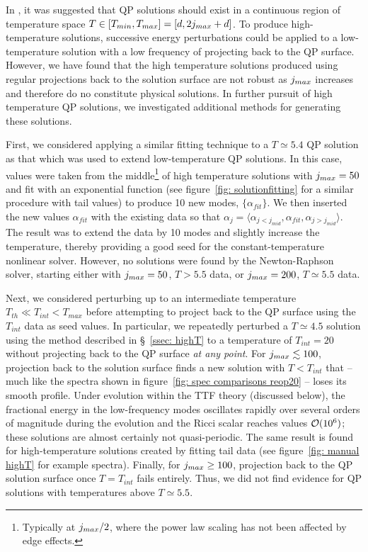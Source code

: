 \documentclass[../PhD.tex]{subfiles}
\begin{document}
In \cite{1507.08261}, it was suggested that QP solutions should exist in a continuous region of temperature space ${T \in [T_{min}, T_{max}] = [d, 2j_{max} + d]}$. To produce high-temperature solutions, successive energy perturbations could be applied to a low-temperature solution with a low frequency of projecting back to the QP surface. However, we have found that the high temperature solutions produced using regular projections back to the solution surface are not robust as $j_{max}$ increases and therefore do no constitute physical solutions. In further pursuit of high temperature QP solutions, we investigated additional methods for generating these solutions.

First, we considered applying a similar fitting technique to a $T \simeq 5.4$ QP solution as that which was used to extend low-temperature QP solutions. In this case, values were taken from the middle\footnote{Typically at $j_{max} / 2$, where the power law scaling has not been affected by edge effects.} of high temperature solutions with $j_{max} = 50$ and fit with an exponential function (see figure~\ref{fig: solutionfitting} for a similar procedure with tail values) to produce 10 new modes, $\{ \alpha_{fit} \}$. We then inserted the new values $\alpha_{fit}$ with the existing data so that $\alpha_j = \langle \alpha_{j< j_{mid}}, \alpha_{fit}, \alpha_{j > j_{mid}} \rangle$. The result was to extend the data by 10 modes and slightly increase the temperature, thereby providing a good seed for the constant-temperature nonlinear solver. However, no solutions were found by the Newton-Raphson solver, starting either with $j_{max} = 50$, $T>5.5$ data, or $j_{max} = 200$, $T \simeq 5.5$ data.

Next, we considered perturbing up to an intermediate temperature $T_{th} \ll T_{int} < T_{max}$ before attempting to project back to the QP surface using the $T_{int}$ data as seed values. In particular, we repeatedly perturbed a $T \simeq 4.5$ solution using the method described in \S~\ref{ssec: highT} to a temperature of $T_{int} = 20$ without projecting back to the QP surface \emph{at any point}. For $j_{max} \lesssim 100$, projection back to the solution surface finds a new solution with $T < T_{int}$ that -- much like the spectra shown in figure~\ref{fig: spec comparisons reop20} -- loses its smooth profile. Under evolution within the TTF theory (discussed below), the fractional energy in the low-frequency modes oscillates rapidly over several orders of magnitude during the evolution and the Ricci scalar reaches values $\mathcal O (10^6)$; these solutions are almost certainly not quasi-periodic. The same result is found for high-temperature solutions created by fitting tail data (see figure~\ref{fig: manual highT} for example spectra). Finally, for $j_{max} \geq 100$, projection back to the QP solution surface once $T = T_{int}$ fails entirely. Thus, we did not find evidence for QP solutions with temperatures above $T \simeq 5.5$.
\end{document}
